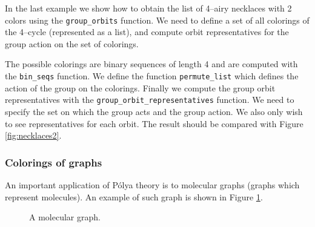 \documentclass[10pt]{article}
\newcommand{\command}[1]{\texttt{#1}}
\begin{document}
In the last example we show how to obtain the list of 4--airy necklaces
with 2 colors using the \command{group\_orbits} function. We need to
define a set of all colorings of the 4--cycle (represented as a list),
and compute orbit representatives for the group action on the set of
colorings.

The possible colorings are binary sequences of length 4 and are
computed with the \command{bin\_seqs} function. We define the function
\command{permute\_list} which defines the action of the group on the
colorings. Finally we compute the group orbit representatives with the
\command{group\_orbit\_representatives} function. We need to specify
the set on which the group acts and the group action. We also only
wish to see representatives for each orbit. The result should be
compared with Figure \ref{fig:necklaces2}.


\subsubsection{Colorings of graphs}

An important application of P\'olya theory is to molecular graphs
(graphs which represent molecules). An example of such graph
is shown in Figure \ref{fig:mgraph}.

\begin{figure}
\begin{center}
\end{center}
\caption{A molecular graph.}
\label{fig:mgraph}
\end{figure}
\end{document}
